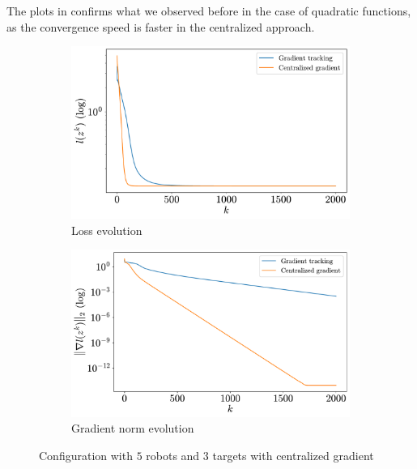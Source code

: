 \documentclass[a4paper,11pt,oneside]{book}
\begin{document}
The plots in  confirms what we observed before in the case of quadratic functions, as the convergence speed is faster in the centralized approach.

\begin{figure}[H]
      \centering
      \begin{subfigure}[t]{0.49\textwidth}
            \centering
            \includegraphics[width=\linewidth]{./figs/tracking/loss_centralized_5_3_2_2000.pdf} 
            \caption{Loss evolution}
      \end{subfigure}
      \hfill
      \begin{subfigure}[t]{0.49\textwidth}
            \centering
            \includegraphics[width=\linewidth]{./figs/tracking/gradient_centralized_5_3_2_2000.pdf} 
            \caption{Gradient norm evolution}
      \end{subfigure}
      \caption{Configuration with $5$ robots and $3$ targets with centralized gradient}
      \label{fig:tracking_centralized_5_3}
\end{figure}
\end{document}
